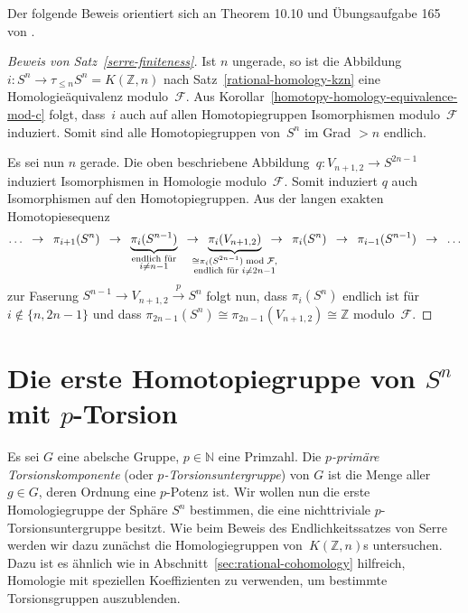 \documentclass[11pt, a4paper, german]{article}
\theoremstyle{definition}
\theoremstyle{remark}
\newcommand{\R}{\mathbb{R}} %
\newcommand{\N}{\mathbb{N}} %
\newcommand{\Z}{\mathbb{Z}} %
\newcommand{\F}{\mathcal{F}} %
\newcommand{\V}[2]{V_{{#2},{#1}}} %
\begin{document}
Der folgende Beweis orientiert sich an Theorem 10.10 und Übungsaufgabe 165 von \cite{davis-kirk:at}.

\begin{proof}[Beweis von Satz~\ref{serre-finiteness}]
  Ist $n$ ungerade, so ist die Abbildung $i : S^n \to \tau_{\leq n} S^n = K(\Z, n)$ nach Satz~\ref{rational-homology-kzn} eine Homologieäquivalenz modulo~$\F$.
  Aus Korollar~\ref{homotopy-homology-equivalence-mod-c} folgt, dass~$i$ auch auf allen Homotopiegruppen Isomorphismen modulo~$\F$ induziert.
  Somit sind alle Homotopiegruppen von~$S^n$ im Grad $> n$ endlich.

  Es sei nun $n$ gerade.
  Die oben beschriebene Abbildung~$q : \V{2}{n+1} \to S^{2n-1}$ induziert Isomorphismen in Homologie modulo~$\F$.
  Somit induziert $q$ auch Isomorphismen auf den Homotopiegruppen.
  Aus der langen exakten Homotopiesequenz
  \[
    \ldots
    \enspace\to\enspace
    \pi_{i+1}(S^n)
    \enspace\to\enspace
    \underbrace{\pi_i(S^{n-1})}_{\substack{\text{endlich für} \\ i \neq n-1}}
    \enspace\to\enspace \underbrace{\pi_i(\V{2}{n+1})}_{\mathclap{\substack{\cong \pi_i(S^{2n-1}) \bmod{\F}, \\ \text{endlich für } i \neq 2n-1}}}
    \enspace\to\enspace
    \pi_i(S^n)
    \enspace\to\enspace
    \pi_{i-1}(S^{n-1})
    \enspace\to\enspace
    \ldots
  \]
  zur Faserung $S^{n-1} \to \V{2}{n+1} \xrightarrow{p} S^n$ folgt nun, dass $\pi_i(S^n)$ endlich ist für $i \not\in \{ n, 2n-1 \}$ und dass $\pi_{2n-1}(S^n) \cong \pi_{2n-1}(\V{2}{n+1}) \cong \Z$ modulo~$\F$.
\end{proof}

\section{Die erste Homotopiegruppe von $S^n$ mit $p$-Torsion}

Es sei $G$ eine abelsche Gruppe, $p \in \N$ eine Primzahl.
Die \emph{$p$-primäre Torsionskomponente} (oder \emph{$p$-Torsionsuntergruppe}) von $G$ ist die Menge aller $g \in G$, deren Ordnung eine $p$-Potenz ist.
Wir wollen nun die erste Homologiegruppe der Sphäre $S^n$ bestimmen, die eine nichttriviale $p$-Torsionsuntergruppe besitzt.
Wie beim Beweis des Endlichkeitssatzes von Serre werden wir dazu zunächst die Homologiegruppen von~$K(\Z, n)$s untersuchen.
Dazu ist es ähnlich wie in Abschnitt~\ref{sec:rational-cohomology} hilfreich, Homologie mit speziellen Koeffizienten zu verwenden, um bestimmte Torsionsgruppen auszublenden.
\end{document}
